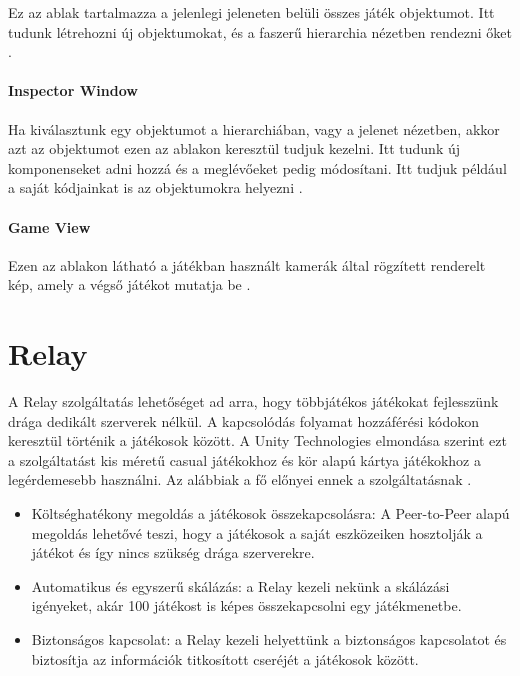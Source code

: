 \documentclass[]{thesis-ekf}
\theoremstyle{definition}
\theoremstyle{remark}
\begin{document}
Ez az ablak tartalmazza a jelenlegi jeleneten belüli összes játék objektumot. Itt tudunk létrehozni új objektumokat, és a faszerű hierarchia nézetben rendezni őket \cite{UnityHierarchyWindow}.

\paragraph{Inspector Window}

Ha kiválasztunk egy objektumot a hierarchiában, vagy a jelenet nézetben, akkor azt az objektumot ezen az ablakon keresztül tudjuk kezelni. Itt tudunk új komponenseket adni hozzá és a meglévőeket pedig módosítani. Itt tudjuk például a saját kódjainkat is az objektumokra helyezni \cite{UnityInspectorWindow}.

\paragraph{Game View}

Ezen az ablakon látható a játékban használt kamerák által rögzített renderelt kép, amely a végső játékot mutatja be \cite{UnityGameView}.

\section{Relay}

\label{sec-relay}
A Relay szolgáltatás lehetőséget ad arra, hogy többjátékos játékokat fejlesszünk drága dedikált szerverek nélkül. A kapcsolódás folyamat hozzáférési kódokon keresztül történik a játékosok között. A Unity Technologies elmondása szerint ezt a szolgáltatást kis méretű casual játékokhoz és kör alapú kártya játékokhoz a legérdemesebb használni. Az alábbiak a fő előnyei ennek a szolgáltatásnak \cite{UnityRelayService} \cite{UnityRelayDocs}.

\begin{itemize}
	\item Költséghatékony megoldás a játékosok összekapcsolásra: A Peer-to-Peer alapú megoldás lehetővé teszi, hogy a játékosok a saját eszközeiken hosztolják a játékot és így nincs szükség drága szerverekre.
	\item Automatikus és egyszerű skálázás: a Relay kezeli nekünk a skálázási igényeket, akár 100 játékost is képes összekapcsolni egy játékmenetbe.
	\item Biztonságos kapcsolat: a Relay kezeli helyettünk a biztonságos kapcsolatot és biztosítja az információk titkosított cseréjét a játékosok között.
\end{itemize}
\end{document}
